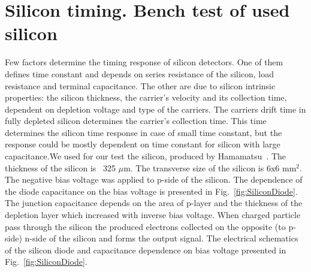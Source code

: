 \documentclass[12pt]{article}
\begin{document}
\section{Silicon timing. Bench test of used silicon}
\label{sec:siliconpad}

Few factors determine the timing response of silicon detectors. One of them
defines time constant and depends on series resistance of the silicon, load
resistance and terminal capacitance. The other are due to silicon intrinsic
properties: the silicon thickness, the carrier’s velocity and its collection
time, dependent on depletion voltage and type of the carriers. The carriers
drift time in fully depleted silicon determines the carrier’s collection time.
This time determines the silicon time response in case of small time constant,
but the response could be mostly dependent on time constant for silicon with
large capacitance.We used for our test the silicon, produced by Hamamatsu~\cite{hamamatsu}. The
thickness of the silicon is ~325 $\mu$m. The transverse size of the silicon is
6x6 mm$^2$. The negative bias voltage was applied to p-side of the silicon. The
dependence of the diode capacitance on the bias voltage is presented in
Fig.~\ref{fig:SiliconDiode}. The junction capacitance depends on the area of
p-layer and the thickness of the depletion layer which increased with inverse
bias voltage. When charged particle pass through the silicon the produced
electrons collected on the opposite (to p-side) n-side of the silicon and forms
the output signal. The electrical schematics of the silicon diode and
capacitance dependence on bias voltage presented in Fig.~\ref{fig:SiliconDiode}.
\end{document}
